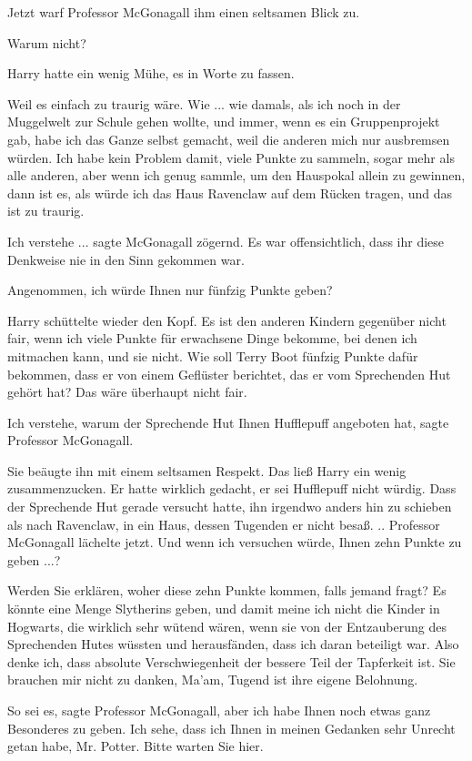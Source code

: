 Jetzt warf Professor McGonagall ihm einen seltsamen Blick zu.

\glqq{}Warum nicht?\grqq{}

Harry hatte ein wenig Mühe, es in Worte zu fassen.

\glqq{}Weil es einfach zu traurig wäre. Wie ... wie damals, als ich noch in der
Muggelwelt zur Schule gehen wollte, und immer, wenn es ein Gruppenprojekt gab,
habe ich das Ganze selbst gemacht, weil die anderen mich nur ausbremsen würden.
Ich habe kein Problem damit, viele Punkte zu sammeln, sogar mehr als alle
anderen, aber wenn ich genug sammle, um den Hauspokal allein zu gewinnen, dann
ist es, als würde ich das Haus Ravenclaw auf dem Rücken tragen, und das ist zu
traurig.\grqq{}

\glqq{}Ich verstehe ...\grqq{} sagte McGonagall zögernd. Es war offensichtlich,
dass ihr diese Denkweise nie in den Sinn gekommen war.

\glqq{}Angenommen, ich würde Ihnen nur fünfzig Punkte geben?\grqq{}

Harry schüttelte wieder den Kopf. \glqq{}Es ist den anderen Kindern gegenüber
nicht fair, wenn ich viele Punkte für erwachsene Dinge bekomme, bei denen ich
mitmachen kann, und sie nicht. Wie soll Terry Boot fünfzig Punkte dafür
bekommen, dass er von einem Geflüster berichtet, das er vom Sprechenden Hut
gehört hat? Das wäre überhaupt nicht fair.\grqq{}

\glqq{}Ich verstehe, warum der Sprechende Hut Ihnen Hufflepuff angeboten
hat\grqq{}, sagte Professor McGonagall.

Sie beäugte ihn mit einem seltsamen Respekt. Das ließ Harry ein wenig
zusammenzucken. Er hatte wirklich gedacht, er sei Hufflepuff nicht würdig. Dass
der Sprechende Hut gerade versucht hatte, ihn irgendwo anders hin zu schieben
als nach Ravenclaw, in ein Haus, dessen Tugenden er nicht besaß. .. Professor
McGonagall lächelte jetzt. \glqq{}Und wenn ich versuchen würde, Ihnen zehn Punkte
zu geben ...?\grqq{}

\glqq{}Werden Sie erklären, woher diese zehn Punkte kommen, falls jemand fragt?
Es könnte eine Menge Slytherins geben, und damit meine ich nicht die Kinder in
Hogwarts, die wirklich sehr wütend wären, wenn sie von der Entzauberung des
Sprechenden Hutes wüssten und herausfänden, dass ich daran beteiligt war. Also
denke ich, dass absolute Verschwiegenheit der bessere Teil der Tapferkeit ist.
Sie brauchen mir nicht zu danken, Ma'am, Tugend ist ihre eigene
Belohnung.\grqq{}

\glqq{}So sei es\grqq{}, sagte Professor McGonagall, \glqq{}aber ich habe Ihnen
noch etwas ganz Besonderes zu geben. Ich sehe, dass ich Ihnen in meinen Gedanken
sehr Unrecht getan habe, Mr. Potter. Bitte warten Sie hier.\grqq{}

